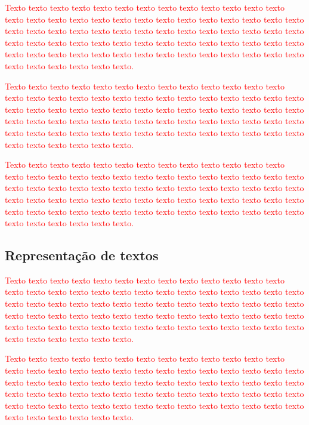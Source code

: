 \documentclass[normaltoc, espacoumemeio, pnumromarab,ruledheader]{abnt}
\begin{document}
	\textcolor{red}{Texto texto texto texto texto texto texto texto texto texto texto texto texto texto texto texto texto texto texto texto texto texto texto texto texto texto texto texto texto texto texto texto texto texto texto texto texto texto texto texto texto texto texto texto texto texto texto texto texto texto texto texto texto texto texto texto texto texto texto texto texto texto texto texto texto texto texto texto texto texto texto texto texto texto texto.}
	
	\textcolor{red}{Texto texto texto texto texto texto texto texto texto texto texto texto texto texto texto texto texto texto texto texto texto texto texto texto texto texto texto texto texto texto texto texto texto texto texto texto texto texto texto texto texto texto texto texto texto texto texto texto texto texto texto texto texto texto texto texto texto texto texto texto texto texto texto texto texto texto texto texto texto texto texto texto texto texto texto.}
	
	\textcolor{red}{Texto texto texto texto texto texto texto texto texto texto texto texto texto texto texto texto texto texto texto texto texto texto texto texto texto texto texto texto texto texto texto texto texto texto texto texto texto texto texto texto texto texto texto texto texto texto texto texto texto texto texto texto texto texto texto texto texto texto texto texto texto texto texto texto texto texto texto texto texto texto texto texto texto texto texto.}
	
	 \subsection{Representação de textos}
	
	\textcolor{red}{Texto texto texto texto texto texto texto texto texto texto texto texto texto texto texto texto texto texto texto texto texto texto texto texto texto texto texto texto texto texto texto texto texto texto texto texto texto texto texto texto texto texto texto texto texto texto texto texto texto texto texto texto texto texto texto texto texto texto texto texto texto texto texto texto texto texto texto texto texto texto texto texto texto texto texto.}
	
	\textcolor{red}{Texto texto texto texto texto texto texto texto texto texto texto texto texto texto texto texto texto texto texto texto texto texto texto texto texto texto texto texto texto texto texto texto texto texto texto texto texto texto texto texto texto texto texto texto texto texto texto texto texto texto texto texto texto texto texto texto texto texto texto texto texto texto texto texto texto texto texto texto texto texto texto texto texto texto texto.}
	
\end{document}
